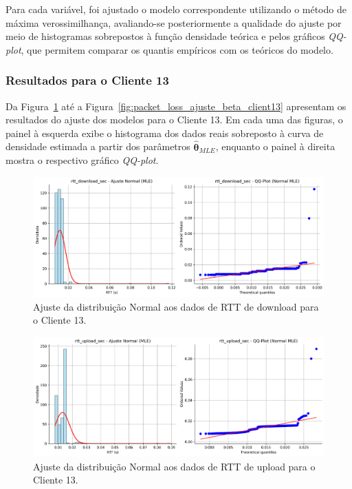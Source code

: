 \documentclass{article}
\begin{document}
Para cada variável, foi ajustado o modelo correspondente utilizando o método de máxima verossimilhança,
avaliando-se posteriormente a qualidade do ajuste por meio de histogramas sobrepostos à função densidade
teórica e pelos gráficos \textit{QQ-plot}, que permitem comparar os quantis empíricos com os teóricos do modelo.

\subsubsection{Resultados para o Cliente 13}

Da Figura~\ref{fig:rtt_download_sec_ajuste_normal_client13} até a Figura~\ref{fig:packet_loss_ajuste_beta_client13}
apresentam os resultados do ajuste dos modelos para o Cliente 13.
Em cada uma das figuras, o painel à esquerda exibe o histograma dos dados reais
sobreposto à curva de densidade estimada a partir dos parâmetros $\hat{\boldsymbol{\theta}}_{MLE}$,
enquanto o painel à direita mostra o respectivo gráfico \textit{QQ-plot}.

\begin{figure}[htp]
	\includegraphics[width=\textwidth]{../figures/mle/rtt_download_sec_ajuste_normal_client13.png}
	\caption{Ajuste da distribuição Normal aos dados de RTT de download para o Cliente 13.}
	\label{fig:rtt_download_sec_ajuste_normal_client13}
\end{figure}

\begin{figure}[htp]
	\includegraphics[width=\textwidth]{../figures/mle/rtt_upload_sec_ajuste_normal_client13.png}
	\caption{Ajuste da distribuição Normal aos dados de RTT de upload para o Cliente 13.}
	\label{fig:rtt_upload_sec_ajuste_normal_client13}
\end{figure}
\end{document}
